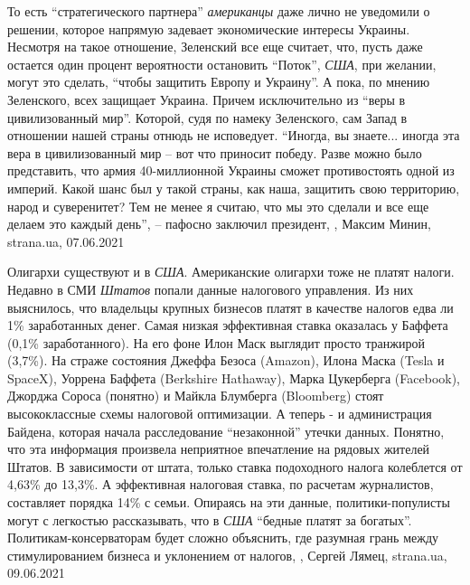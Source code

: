 То есть \enquote{стратегического партнера} \emph{американцы} даже лично не
уведомили о решении, которое напрямую задевает экономические интересы Украины.
Несмотря на такое отношение, Зеленский все еще считает, что, пусть даже
остается один процент вероятности остановить \enquote{Поток}, \emph{США}, при
желании, могут это сделать, \enquote{чтобы защитить Европу и Украину}. А пока,
по мнению Зеленского, всех защищает Украина. Причем исключительно из
\enquote{веры в цивилизованный мир}. Которой, судя по намеку Зеленского, сам
Запад в отношении нашей страны отнюдь не исповедует. \enquote{Иногда, вы
знаете... иногда эта вера в цивилизованный мир – вот что приносит победу. Разве
можно было представить, что армия 40-миллионной Украины сможет противостоять
одной из империй. Какой шанс был у такой страны, как наша, защитить свою
территорию, народ и суверенитет? Тем не менее я считаю, что мы это сделали и
все еще делаем это каждый день}, – пафосно заключил президент,
, Максим Минин, strana.ua, 07.06.2021

Олигархи существуют и в \emph{США}. Американские олигархи тоже не платят налоги.
Недавно в СМИ \emph{Штатов} попали данные налогового управления. Из них выяснилось,
что владельцы крупных бизнесов платят в качестве налогов едва ли 1\%
заработанных денег. Самая низкая эффективная ставка оказалась у Баффета (0,1\%
заработанного). На его фоне Илон Маск выглядит просто транжирой (3,7\%).  На
страже состояния Джеффа Безоса (Amazon), Илона Маска (Tesla и SpaceX), Уоррена
Баффета (Berkshire Hathaway), Марка Цукерберга (Facebook), Джорджа Сороса
(понятно) и Майкла Блумберга (Bloomberg) стоят высококлассные схемы налоговой
оптимизации. А теперь - и администрация Байдена, которая начала расследование
\enquote{незаконной} утечки данных.  Понятно, что эта информация произвела неприятное
впечатление на рядовых жителей Штатов. В зависимости от штата, только ставка
подоходного налога колеблется от 4,63\% до 13,3\%. А эффективная налоговая
ставка, по расчетам журналистов, составляет порядка 14\% с семьи. Опираясь на
эти данные, политики-популисты могут с легкостью рассказывать, что в \emph{США}
\enquote{бедные платят за богатых}. Политикам-консерваторам будет сложно объяснить, где
разумная грань между стимулированием бизнеса и уклонением от налогов,
, Сергей Лямец, strana.ua, 09.06.2021

